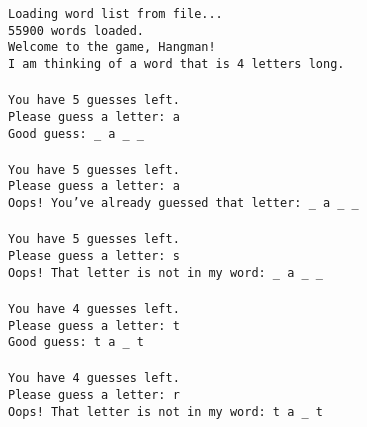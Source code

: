 \documentclass[12pt]{article}
\begin{document}
\begin{enumerate}
	\begin{center}
		\begin{minipage}{14cm}
			\texttt{Loading word list from file...\\
			55900 words loaded.\\
			Welcome to the game, Hangman!\\
			I am thinking of a word that is 4 letters long. }\\
			\texttt{\textendash \textendash \textendash \textendash \textendash \textendash \textendash \textendash \textendash \textendash \textendash \textendash \textendash}\\
			\texttt{You have 5 guesses left.\\
			Please guess a letter: a\\
			Good guess:  \_ a \_ \_ }\\
			\texttt{\textendash \textendash \textendash \textendash \textendash \textendash \textendash \textendash \textendash \textendash \textendash \textendash \textendash}\\
			\texttt{You have 5 guesses left.\\
			Please guess a letter: a\\
			Oops! You've already guessed that letter:  \_ a \_ \_ }\\ 
			\texttt{\textendash \textendash \textendash \textendash \textendash \textendash \textendash \textendash \textendash \textendash \textendash \textendash \textendash}\\
			\texttt{You have 5 guesses left.\\
			Please guess a letter: s\\
			Oops! That letter is not in my word: \_ a \_ \_}\\
			\texttt{\textendash \textendash \textendash \textendash \textendash \textendash \textendash \textendash \textendash \textendash \textendash \textendash \textendash}\\
			\texttt{You have 4 guesses left.\\
			Please guess a letter: t\\
			Good guess:  t a \_ t}\\
			\texttt{\textendash \textendash \textendash \textendash \textendash \textendash \textendash \textendash \textendash \textendash \textendash \textendash \textendash}\\
			\texttt{You have 4 guesses left.\\
			Please guess a letter: r \\
			Oops! That letter is not in my word: t a \_ t}\\

\end{minipage}
\end{center}
\end{enumerate}
\end{document}
